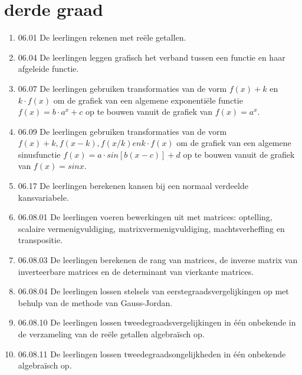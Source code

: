 \documentclass{article}
\begin{document}
\section{derde graad}


\begin{enumerate}

    \item 06.01 De leerlingen rekenen met reële getallen.
    
    \item 06.04 De leerlingen leggen grafisch het verband tussen een functie en haar afgeleide functie.
    

    \item 06.07 De leerlingen gebruiken transformaties van de vorm \(f(x) + k\) en \(k·f(x)\) om de grafiek van een algemene exponentiële functie \(f(x)=b·a^x+c\) op te bouwen vanuit de grafiek van \(f(x)=a^x\).
    
    \item 06.09 De leerlingen gebruiken transformaties van de vorm \( f(x)+k, f(x-k), f(x/k) en k·f(x)\) om de grafiek van een algemene sinusfunctie \(f(x)= a·sin[b(x-c)]+d\) op te bouwen vanuit de grafiek van \(f(x)=sin x\).
    
    \item 06.17 De leerlingen berekenen kansen bij een normaal verdeelde kansvariabele.
    
    
    
    \item 06.08.01 De leerlingen voeren bewerkingen uit met matrices: optelling, scalaire vermenigvuldiging, matrixvermenigvuldiging, machtsverheffing en transpositie.
    
    \item 06.08.03 De leerlingen berekenen de rang van matrices, de inverse matrix van inverteerbare matrices en de determinant van vierkante matrices.
    
    \item 06.08.04 De leerlingen lossen stelsels van eerstegraadsvergelijkingen op met behulp van de methode van Gauss-Jordan.
    
    \item 06.08.10 De leerlingen lossen tweedegraadsvergelijkingen in één onbekende in de verzameling van de reële getallen algebraïsch op.
    
    \item {06.08.11 De leerlingen lossen tweedegraadsongelijkheden in één onbekende algebraïsch op.}
    

\end{enumerate}
\end{document}

